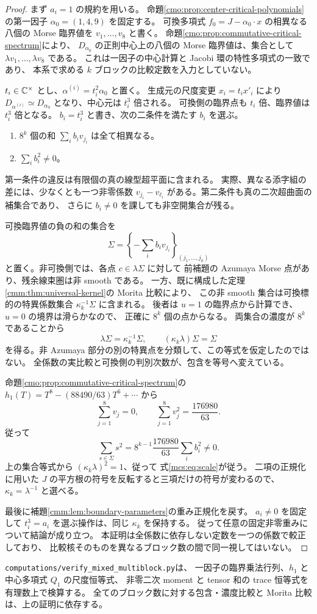 \begin{proof}
まず $a_i=1$ の規約を用いる。
命題\ref{cmo:prop:center-critical-polynomials}の第一因子
$\alpha_0=(1,4,9)$ を固定する。
可換多項式 $f_0=J-\alpha_0\cdot x$ の相異なる八個の Morse 臨界値を
$v_1,\ldots,v_8$ と書く。
命題\ref{cmo:prop:commutative-critical-spectrum}により、
$D_{\alpha_0}$ の正則中心上の八個の Morse 臨界値は、集合として
$\lambda v_1,\ldots,\lambda v_8$ である。
これは一因子の中心計算と Jacobi 環の特性多項式の一致であり、
本系で求める $k$ ブロックの比較定数を入力としていない。

$t_i\in\mathbb C^\times$ とし、$\alpha^{(i)}=t_i^2\alpha_0$ と置く。
生成元の尺度変更 $x_i=t_ix'_i$ により
$D_{\alpha^{(i)}}\simeq D_{\alpha_0}$ となり、中心元は $t_i^3$ 倍される。
可換側の臨界点も $t_i$ 倍、臨界値は $t_i^3$ 倍となる。
$b_i=t_i^3$ と書き、次の二条件を満たす $b_i$ を選ぶ。
\begin{enumerate}
 \item $8^k$ 個の和 $\sum_i b_iv_{j_i}$ は全て相異なる。
 \item $\sum_i b_i^2\ne0$。
\end{enumerate}
第一条件の違反は有限個の真の線型超平面に含まれる。
実際、異なる添字組の差には、少なくとも一つ非零係数
$v_{j_i}-v_{\ell_i}$ がある。第二条件も真の二次超曲面の補集合であり、
さらに $b_i\ne0$ を課しても非空開集合が残る。

可換臨界値の負の和の集合を
\[
 \Sigma=\left\{-\sum_i b_iv_{j_i}\right\}_{(j_1,\ldots,j_k)}
\]
と置く。非可換側では、各点 $c\in\lambda\Sigma$ に対して
前補題の Azumaya Morse 点があり、残余線束圏は非 smooth である。
一方、既に構成した定理\ref{cmm:thm:universal-kernel}の Morita 比較により、
この非 smooth 集合は可換標的の特異係数集合
$\kappa_k^{-1}\Sigma$ に含まれる。
後者は $u=1$ の臨界点から計算でき、$u=0$ の境界は滑らかなので、
正確に $8^k$ 個の点からなる。
両集合の濃度が $8^k$ であることから
\[
 \lambda\Sigma=\kappa_k^{-1}\Sigma,
       \qquad (\kappa_k\lambda)\Sigma=\Sigma
\]
を得る。非 Azumaya 部分の別の特異点を分類して、この等式を仮定したのではない。
全係数の実比較と可換側の判別次数が、包含を等号へ変えている。

命題\ref{cmo:prop:commutative-critical-spectrum}の
$h_1(T)=T^8-(88490/63)T^6+\cdots$ から
\[
 \sum_{j=1}^8v_j=0,\qquad
 \sum_{j=1}^8v_j^2=\frac{176980}{63}.
\]
従って
\begin{equation}\label{mcs:eq:second-moment}
 \sum_{s\in\Sigma}s^2
     =8^{k-1}\frac{176980}{63}\sum_i b_i^2\ne0.
\end{equation}
上の集合等式から $(\kappa_k\lambda)^2=1$、従って
式\eqref{mcs:eq:scale}が従う。
二項の正規化に用いた $J$ の平方根の符号を反転すると三項だけの符号が変わるので、
$\kappa_k=\lambda^{-1}$ と選べる。

最後に補題\ref{cmm:lem:boundary-parameters}の重み正規化を戻す。
$a_i\ne0$ を固定して $t_i^3=a_i$ を選ぶ操作は、同じ $\kappa_k$ を保持する。
従って任意の固定非零重みについて結論が成り立つ。
本証明は全係数に依存しない定数を一つの係数で較正しており、
比較核そのものを異なるブロック数の間で同一視してはいない。
\end{proof}

\texttt{computations/verify\_mixed\_multiblock.py}は、
一因子の臨界乗法行列、$h_1$ と中心多項式 $Q_1$ の尺度恒等式、
非零二次 moment と tensor 和の trace 恒等式を有理数上で検算する。
全てのブロック数に対する包含・濃度比較と Morita 比較は、上の証明に依存する。
